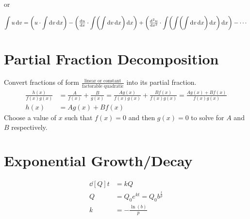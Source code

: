 \documentclass[12pt]{article}
\DeclarePairedDelimiter\paren{(}{)}
\newcommand*{\D}[1]{\mathop{}\!\mathrm{d}#1}
\newcommand*{\fixmath}{%
  \makebox{}\vspace{\glueexpr-\baselineskip-\abovedisplayskip}}
\newenvironment{fixbskip}{\setlength{\belowdisplayskip}{0pt}\ignorespaces}%
  {\ignorespacesafterend}
\newenvironment{fixskip}{\setlength{\abovedisplayskip}{0pt}%
  \setlength{\belowdisplayskip}{0pt}\fixmath\ignorespaces}%
  {\ignorespacesafterend}
\begin{document}
or

\begin{fixbskip}
  \[
    \int u \D{v} = \paren*{u \cdot \int \D{v} \D{x}}
      - \paren*{\dd[u]{x} \cdot \int \paren*{ \int \D{v} \D{x}} \D{x}}
      + \paren*{\dd[2][u]{x} \cdot \int \paren*{\int \paren*{\int \D{v} \D{x}}
        \D{x}} \D{x}} - \cdots
  \]
\end{fixbskip}
\section*{Partial Fraction Decomposition}
Convert fractions of form \(\frac{\text{linear or constant}}{\text{factorable
quadratic}}\) into its partial fraction.
\begin{align*}
  \frac{h(x)}{f(x)g(x)} &= \frac{A}{f(x)} + \frac{B}{g(x)} = \frac{Ag(x)}
  {f(x)g(x)} + \frac{Bf(x)}{f(x)g(x)} = \frac{Ag(x) + Bf(x)}{f(x)g(x)}\\
  h(x) &= Ag(x) + Bf(x)
\end{align*}
Choose a value of \(x\) such that \(f(x) = 0\) and then \(g(x) = 0\) to solve
for \(A\) and \(B\) respectively.
\section*{Exponential Growth\slash Decay}
\begin{fixskip}
  \begin{align*}
    \dd[Q]{t} &= kQ\\
    Q &= Q_0 e^{kt} = Q_0 b^{\frac{t}{p}}\\
    k &= -\frac{\ln(b)}{p}
  \end{align*}
\end{fixskip}
\end{document}
